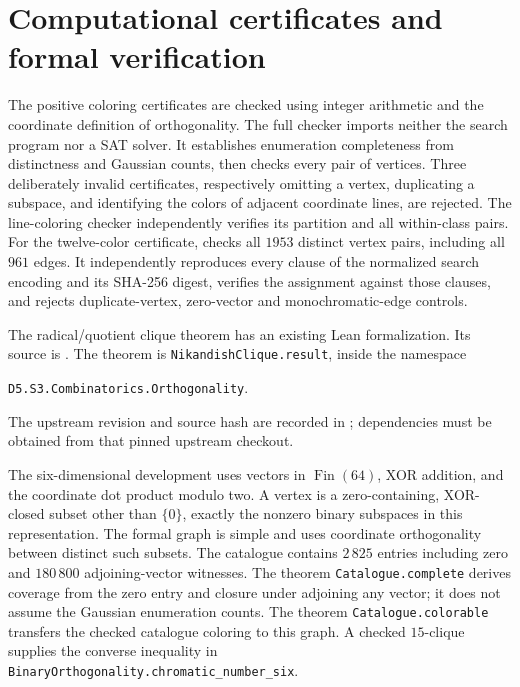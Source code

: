 \section{Computational certificates and formal verification}\label{sec:verification}
The positive coloring certificates are checked using integer arithmetic and
the coordinate definition of orthogonality. The full checker imports neither
the search program nor a SAT solver. It establishes enumeration completeness
from distinctness and Gaussian counts, then checks every pair of vertices.
Three deliberately invalid certificates, respectively omitting a vertex,
duplicating a subspace, and identifying the colors of adjacent coordinate
lines, are rejected. The line-coloring checker independently verifies its
partition and all within-class pairs. For the twelve-color certificate,
 checks all $1953$ distinct
vertex pairs, including all $961$ edges. It independently reproduces every
clause of the normalized search encoding and its SHA-256 digest, verifies
the assignment against those clauses, and rejects duplicate-vertex,
zero-vector and monochromatic-edge controls.

The radical/quotient clique theorem has an existing Lean formalization.
Its source is . The theorem is
\texttt{NikandishClique.result}, inside the namespace
\begin{center}
\texttt{D5.S3.Combinatorics.Orthogonality}.
\end{center}
The upstream revision and source hash are recorded in
; dependencies must be obtained from that pinned
upstream checkout.

The six-dimensional development uses vectors in $\operatorname{Fin}(64)$,
XOR addition, and the coordinate dot product modulo two. A vertex is a
zero-containing, XOR-closed subset other than $\{0\}$, exactly the nonzero
binary subspaces in this representation. The formal graph is simple and
uses coordinate orthogonality between distinct such subsets. The catalogue
contains $2\,825$ entries including zero and $180\,800$ adjoining-vector
witnesses. The theorem \texttt{Catalogue.complete} derives coverage from
the zero entry and closure under adjoining any vector; it does not assume
the Gaussian enumeration counts. The theorem \texttt{Catalogue.colorable}
transfers the checked catalogue coloring to this graph. A checked
$15$-clique supplies the converse inequality in
\texttt{BinaryOrthogonality.chromatic\_number\_six}.

